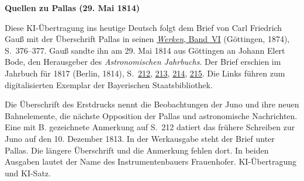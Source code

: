 \clearpage\thispagestyle{empty}
\begin{center}\textbf{Quellen zu Pallas (29. Mai 1814)}\end{center}
\noindent Diese KI-Übertragung ins heutige Deutsch folgt dem Brief von Carl Friedrich Gauß mit der Überschrift Pallas in seinen \href{https://gdz.sub.uni-goettingen.de/id/PPN236007467}{\textit{Werken}, Band~VI} (Göttingen, 1874), S.~376--377. Gauß sandte ihn am 29. Mai 1814 aus Göttingen an Johann Elert Bode, den Herausgeber des \textit{Astronomischen Jahrbuchs}. Der Brief erschien im Jahrbuch für 1817 (Berlin, 1814), S.~\href{https://api.digitale-sammlungen.de/iiif/image/v2/bsb10538346_00220/full/1600,/0/default.jpg}{212}, \href{https://api.digitale-sammlungen.de/iiif/image/v2/bsb10538346_00221/full/1600,/0/default.jpg}{213}, \href{https://api.digitale-sammlungen.de/iiif/image/v2/bsb10538346_00222/full/1600,/0/default.jpg}{214}, \href{https://api.digitale-sammlungen.de/iiif/image/v2/bsb10538346_00223/full/1600,/0/default.jpg}{215}. Die Links führen zum digitalisierten Exemplar der Bayerischen Staatsbibliothek.
\par\smallskip\noindent Die Überschrift des Erstdrucks nennt die Beobachtungen der Juno und ihre neuen Bahnelemente, die nächste Opposition der Pallas und astronomische Nachrichten. Eine mit B. gezeichnete Anmerkung auf S.~212 datiert das frühere Schreiben zur Juno auf den 10. Dezember 1813. In der Werkausgabe steht der Brief unter Pallas. Die längere Überschrift und die Anmerkung fehlen dort. In beiden Ausgaben lautet der Name des Instrumentenbauers Frauenhofer. KI-Übertragung und KI-Satz.
\clearpage
